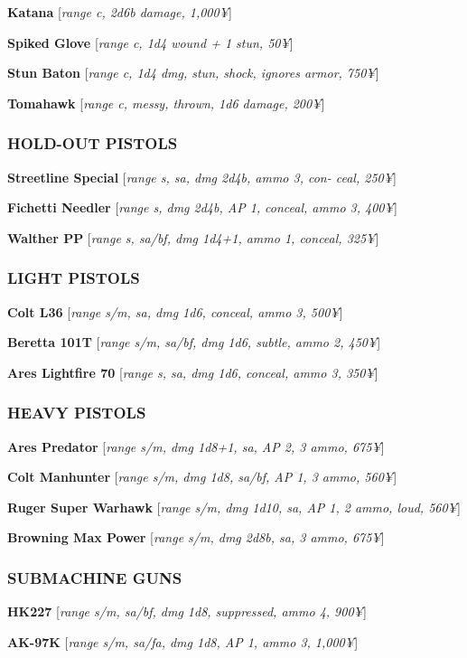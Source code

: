 \documentclass[oneside,10pt]{article}
\begin{document}
\begin{multicols}{2}
\textbf{Katana} [\textit{range c, 2d6b damage,
  1,000¥}]

\textbf{Spiked Glove} [\textit{range c, 1d4 wound
  + 1 stun, 50¥}]

\textbf{Stun Baton} [\textit{range c, 1d4 dmg, stun, shock, ignores armor,
750¥}]

\textbf{Tomahawk} [\textit{range c, messy, thrown,
  1d6 damage, 200¥}]


\subsubsection{HOLD-OUT PISTOLS}
\textbf{Streetline Special} [\textit{range s, sa, dmg 2d4b, ammo 3, con- 
ceal, 250¥}] 

\textbf{ Fichetti Needler} [\textit{range s, dmg 2d4b, AP 1, conceal, ammo 
 3, 400¥}] 

\textbf{Walther PP} [\textit{range s, sa/bf, dmg 1d4+1, ammo 1, conceal, 
  325¥}] 


\subsubsection{LIGHT PISTOLS}
\textbf{Colt L36} [\textit{range s/m, sa, dmg 1d6,
  conceal, ammo 3, 500¥}]

\textbf{Beretta 101T} [\textit{range s/m, sa/bf, dmg 1d6, subtle, ammo 2,
450¥}]

\textbf{Ares Lightfire 70} [\textit{range s, sa, dmg 1d6, conceal, ammo 3,
350¥}]


\subsubsection{HEAVY PISTOLS}
\textbf{Ares Predator} [\textit{range s/m, dmg 1d8+1, sa, AP 2, 3 ammo,
675¥}]

\textbf{Colt Manhunter} [\textit{range s/m, dmg 1d8, sa/bf, AP 1, 3 ammo,
560¥}]

\textbf{Ruger Super Warhawk} [\textit{range s/m, dmg 1d10, sa, AP 1, 2
ammo, loud, 560¥}]

\textbf{Browning Max Power} [\textit{range s/m, dmg 2d8b, sa, 3 ammo,
675¥}]


\subsubsection{SUBMACHINE GUNS}
\textbf{HK227} [\textit{range s/m, sa/bf, dmg 1d8, suppressed, ammo 4,
900¥}]

\textbf{AK-97K} [\textit{range s/m, sa/fa, dmg
  1d8, AP 1, ammo 3, 1,000¥}]


\end{multicols}
\end{document}
